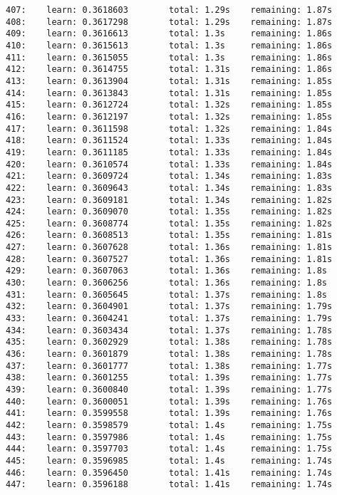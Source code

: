 \documentclass[11pt]{article}
\begin{document}
\begin{Verbatim}[commandchars=\\\{\}]
407:    learn: 0.3618603        total: 1.29s    remaining: 1.87s
408:    learn: 0.3617298        total: 1.29s    remaining: 1.87s
409:    learn: 0.3616613        total: 1.3s     remaining: 1.86s
410:    learn: 0.3615613        total: 1.3s     remaining: 1.86s
411:    learn: 0.3615055        total: 1.3s     remaining: 1.86s
412:    learn: 0.3614755        total: 1.31s    remaining: 1.86s
413:    learn: 0.3613904        total: 1.31s    remaining: 1.85s
414:    learn: 0.3613843        total: 1.31s    remaining: 1.85s
415:    learn: 0.3612724        total: 1.32s    remaining: 1.85s
416:    learn: 0.3612197        total: 1.32s    remaining: 1.85s
417:    learn: 0.3611598        total: 1.32s    remaining: 1.84s
418:    learn: 0.3611524        total: 1.33s    remaining: 1.84s
419:    learn: 0.3611185        total: 1.33s    remaining: 1.84s
420:    learn: 0.3610574        total: 1.33s    remaining: 1.84s
421:    learn: 0.3609724        total: 1.34s    remaining: 1.83s
422:    learn: 0.3609643        total: 1.34s    remaining: 1.83s
423:    learn: 0.3609181        total: 1.34s    remaining: 1.82s
424:    learn: 0.3609070        total: 1.35s    remaining: 1.82s
425:    learn: 0.3608774        total: 1.35s    remaining: 1.82s
426:    learn: 0.3608513        total: 1.35s    remaining: 1.81s
427:    learn: 0.3607628        total: 1.36s    remaining: 1.81s
428:    learn: 0.3607527        total: 1.36s    remaining: 1.81s
429:    learn: 0.3607063        total: 1.36s    remaining: 1.8s
430:    learn: 0.3606256        total: 1.36s    remaining: 1.8s
431:    learn: 0.3605645        total: 1.37s    remaining: 1.8s
432:    learn: 0.3604901        total: 1.37s    remaining: 1.79s
433:    learn: 0.3604241        total: 1.37s    remaining: 1.79s
434:    learn: 0.3603434        total: 1.37s    remaining: 1.78s
435:    learn: 0.3602929        total: 1.38s    remaining: 1.78s
436:    learn: 0.3601879        total: 1.38s    remaining: 1.78s
437:    learn: 0.3601777        total: 1.38s    remaining: 1.77s
438:    learn: 0.3601255        total: 1.39s    remaining: 1.77s
439:    learn: 0.3600840        total: 1.39s    remaining: 1.77s
440:    learn: 0.3600051        total: 1.39s    remaining: 1.76s
441:    learn: 0.3599558        total: 1.39s    remaining: 1.76s
442:    learn: 0.3598579        total: 1.4s     remaining: 1.75s
443:    learn: 0.3597986        total: 1.4s     remaining: 1.75s
444:    learn: 0.3597703        total: 1.4s     remaining: 1.75s
445:    learn: 0.3596985        total: 1.4s     remaining: 1.74s
446:    learn: 0.3596450        total: 1.41s    remaining: 1.74s
447:    learn: 0.3596188        total: 1.41s    remaining: 1.74s

\end{Verbatim}
\end{document}
